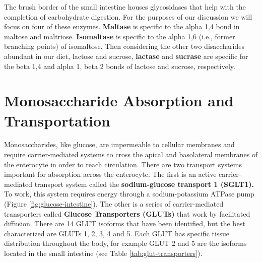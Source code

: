 \documentclass{tufte-handout}
\begin{document}
The brush border of the small intestine houses glycosidases that help with the completion of carbohydrate digestion. For the purposes of our discussion we will focus on four of these enzymes. \textbf{Maltase} is specific to the alpha 1,4 bond in maltose and maltriose. \textbf{Isomaltase} is specific to the alpha 1,6 (i.e., former branching points) of isomaltose. Then considering the other two disaccharides abundant in our diet, lactose and sucrose, \textbf{lactase} and \textbf{sucrase} are specific for the beta 1,4 and alpha 1, beta 2 bonds of lactose and sucrose, respectively.

\section{Monosaccharide Absorption and Transportation}

Monosaccharides, like glucose, are impermeable to cellular membranes and require carrier-mediated systems to cross the apical and basolateral membranes of the enterocyte in order to reach circulation. There are two transport systems important for absorption across the enterocyte. The first is an active carrier-mediated transport system called the \textbf{sodium-glucose transport 1 (SGLT1).} To work, this system requires energy through a sodium-potassium ATPase pump (Figure \ref{fig:glucose-intestine}). The other is a series of carrier-mediated transporters called \textbf{Glucose Transporters (GLUTs)} that work by facilitated diffusion. There are 14 GLUT isoforms that have been identified, but the best characterized are GLUTs 1, 2, 3, 4 and 5. Each GLUT has specific tissue distribution throughout the body, for example GLUT 2 and 5 are the isoforms located in the small intestine (see Table \ref{tab:glut-transporters}).
\end{document}
